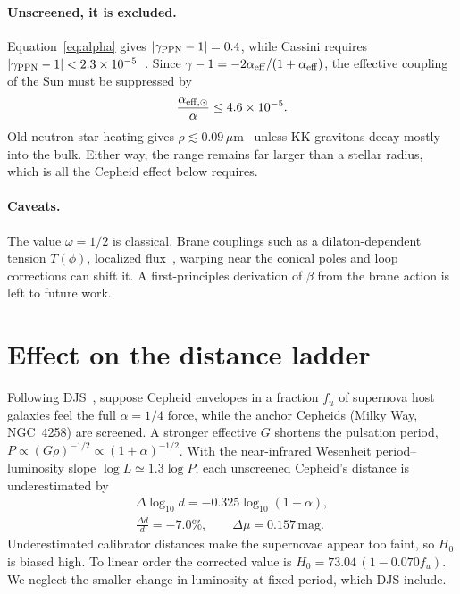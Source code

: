 \documentclass[aps,prd,reprint,superscriptaddress,nofootinbib,floatfix]{revtex4-2}
\theoremstyle{definition}
\newcommand{\um}{\,\mu\mathrm{m}}
\begin{document}
\paragraph*{Unscreened, it is excluded.} Equation~\eqref{eq:alpha} gives $|\gamma_{\rm PPN}-1| = 0.4$, while Cassini requires $|\gamma_{\rm PPN}-1|<2.3\times10^{-5}$~\cite{Cassini2003}. Since $\gamma-1=-2\alpha_{\rm eff}/(1+\alpha_{\rm eff})$, the effective coupling of the Sun must be suppressed by
\begin{equation}
\frac{\alpha_{\rm eff,\odot}}{\alpha}\le 4.6\times10^{-5}. \label{eq:cassini}
\end{equation}
Old neutron-star heating gives $\rho\lesssim0.09\um$~\cite{HannestadRaffelt2003} unless KK gravitons decay mostly into the bulk. Either way, the range remains far larger than a stellar radius, which is all the Cepheid effect below requires.

\paragraph*{Caveats.} The value $\omega=1/2$ is classical. Brane couplings such as a dilaton-dependent tension $T(\phi)$, localized flux~\cite{BDW2015}, warping near the conical poles and loop corrections can shift it. A first-principles derivation of $\beta$ from the brane action is left to future work.

\section{Effect on the distance ladder}\label{sec:ladder}

Following DJS~\cite{DJS2019}, suppose Cepheid envelopes in a fraction $f_u$ of supernova host galaxies feel the full $\alpha=1/4$ force, while the anchor Cepheids (Milky Way, NGC~4258) are screened. A stronger effective $G$ shortens the pulsation period, $P\propto(G\bar\rho)^{-1/2}\propto(1+\alpha)^{-1/2}$. With the near-infrared Wesenheit period--luminosity slope $\log L\simeq1.3\log P$, each unscreened Cepheid's distance is underestimated by
\begin{gather}
\Delta\log_{10}d = -0.325\log_{10}(1+\alpha), \nonumber\\
\frac{\Delta d}{d}=-7.0\%,\qquad\Delta\mu=0.157\,\mathrm{mag}. \label{eq:ceph}
\end{gather}
Underestimated calibrator distances make the supernovae appear too faint, so $H_0$ is biased high. To linear order the corrected value is $H_0 = 73.04\,(1-0.070 f_u)$. We neglect the smaller change in luminosity at fixed period, which DJS include.
\end{document}
